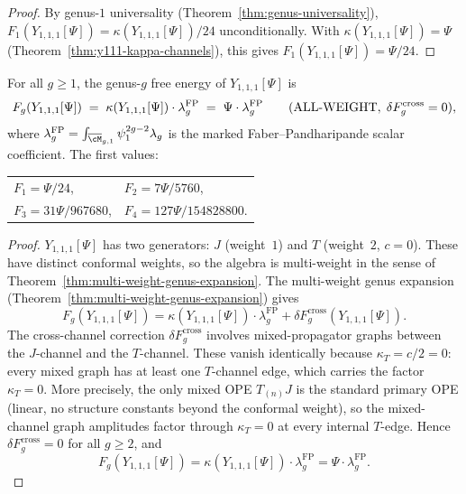\begin{proof}
By genus-$1$ universality
(Theorem~\ref{thm:genus-universality}),
$F_1(Y_{1,1,1}[\Psi])
 = \kappa(Y_{1,1,1}[\Psi])/24$ unconditionally. With
$\kappa(Y_{1,1,1}[\Psi]) = \Psi$
(Theorem~\ref{thm:y111-kappa-channels}), this gives
$F_1(Y_{1,1,1}[\Psi]) = \Psi/24$.
\end{proof}

\begin{proposition}%
\label{prop:y111-genus-tower}
For all $g \geq 1$, the genus-$g$ free energy of
$Y_{1,1,1}[\Psi]$ is
\begin{equation}\label{eq:y111-genus-tower}
F_g(Y_{1,1,1}[\Psi])
\;=\; \kappa(Y_{1,1,1}[\Psi]) \cdot \lambda_g^{\mathrm{FP}}
\;=\; \Psi \cdot \lambda_g^{\mathrm{FP}}
\qquad\textup{(}\text{ALL-WEIGHT},\;
\delta F_g^{\mathrm{cross}} = 0\textup{)},
\end{equation}
where
\(\lambda_g^{\mathrm{FP}}
=\int_{\overline{\cM}_{g,1}}\psi_1^{2g-2}\lambda_g\)
is the marked Faber--Pandharipande scalar coefficient. The first values:
\begin{center}
\begin{tabular}{ll}
$F_1 = \Psi/24$, &
$F_2 = 7\Psi/5760$, \\
$F_3 = 31\Psi/967680$, &
$F_4 = 127\Psi/154828800$.
\end{tabular}
\end{center}
\end{proposition}

\begin{proof}
$Y_{1,1,1}[\Psi]$ has two generators: $J$ (weight~$1$)
and $T$ (weight~$2$, $c = 0$). These have distinct
conformal weights, so the algebra is multi-weight in the
sense of Theorem~\ref{thm:multi-weight-genus-expansion}.
The multi-weight genus expansion
(Theorem~\ref{thm:multi-weight-genus-expansion}) gives
\[
F_g(Y_{1,1,1}[\Psi])
 = \kappa(Y_{1,1,1}[\Psi]) \cdot \lambda_g^{\mathrm{FP}}
 + \delta F_g^{\mathrm{cross}}(Y_{1,1,1}[\Psi]).
\]
The cross-channel correction $\delta F_g^{\mathrm{cross}}$ involves
mixed-propagator graphs between the $J$-channel and the
$T$-channel. These vanish identically because
$\kappa_T = c/2 = 0$: every mixed graph has at least one
$T$-channel edge, which carries the factor $\kappa_T = 0$.
More precisely, the only mixed OPE $T_{(n)} J$ is the standard
primary OPE (linear, no structure constants beyond the
conformal weight), so the mixed-channel graph amplitudes factor
through $\kappa_T = 0$ at every internal $T$-edge. Hence
$\delta F_g^{\mathrm{cross}} = 0$ for all $g \geq 2$, and
\[
F_g(Y_{1,1,1}[\Psi])
 = \kappa(Y_{1,1,1}[\Psi]) \cdot \lambda_g^{\mathrm{FP}}
 = \Psi \cdot \lambda_g^{\mathrm{FP}} .
\]
\end{proof}

